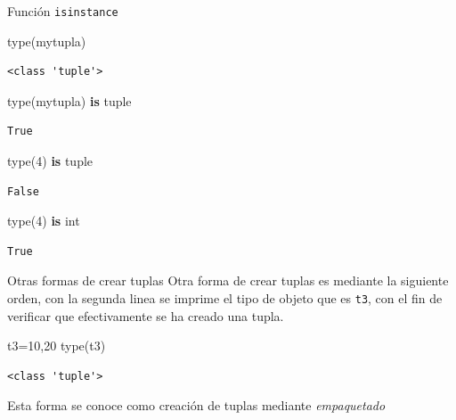 \documentclass[
  ignorenonframetext,
  aspectratio=169,
  spanish,
]{beamer}
\newenvironment{Shaded}{\begin{snugshade}}{\end{snugshade}}
\newcommand{\BuiltInTok}[1]{\textcolor[rgb]{0.00,0.23,0.31}{#1}}
\newcommand{\DecValTok}[1]{\textcolor[rgb]{0.68,0.00,0.00}{#1}}
\newcommand{\KeywordTok}[1]{\textcolor[rgb]{0.00,0.23,0.31}{\textbf{#1}}}
\newcommand{\NormalTok}[1]{\textcolor[rgb]{0.00,0.23,0.31}{#1}}
\newcommand{\OperatorTok}[1]{\textcolor[rgb]{0.37,0.37,0.37}{#1}}
\begin{document}
\begin{frame}[fragile]{Función \texttt{isinstance}}
\label{funciuxf3n-isinstance-1}
\begin{Shaded}
\begin{Highlighting}[]
\BuiltInTok{type}\NormalTok{(mytupla)}
\end{Highlighting}
\end{Shaded}

\begin{verbatim}
<class 'tuple'>
\end{verbatim}

\begin{Shaded}
\begin{Highlighting}[]
\BuiltInTok{type}\NormalTok{(mytupla) }\KeywordTok{is} \BuiltInTok{tuple}
\end{Highlighting}
\end{Shaded}

\begin{verbatim}
True
\end{verbatim}

\begin{Shaded}
\begin{Highlighting}[]
\BuiltInTok{type}\NormalTok{(}\DecValTok{4}\NormalTok{) }\KeywordTok{is} \BuiltInTok{tuple}
\end{Highlighting}
\end{Shaded}

\begin{verbatim}
False
\end{verbatim}

\begin{Shaded}
\begin{Highlighting}[]
\BuiltInTok{type}\NormalTok{(}\DecValTok{4}\NormalTok{) }\KeywordTok{is} \BuiltInTok{int}
\end{Highlighting}
\end{Shaded}

\begin{verbatim}
True
\end{verbatim}
\end{frame}

\begin{frame}[fragile]{Otras formas de crear tuplas}
\label{otras-formas-de-crear-tuplas}
Otra forma de crear tuplas es mediante la siguiente orden, con la
segunda linea se imprime el tipo de objeto que es \texttt{t3}, con el
fin de verificar que efectivamente se ha creado una tupla.

\begin{Shaded}
\begin{Highlighting}[]
\NormalTok{t3}\OperatorTok{=}\DecValTok{10}\NormalTok{,}\DecValTok{20} 
\BuiltInTok{type}\NormalTok{(t3)  }
\end{Highlighting}
\end{Shaded}

\begin{verbatim}
<class 'tuple'>
\end{verbatim}

Esta forma se conoce como creación de tuplas mediante \emph{empaquetado}
\end{frame}
\end{document}
